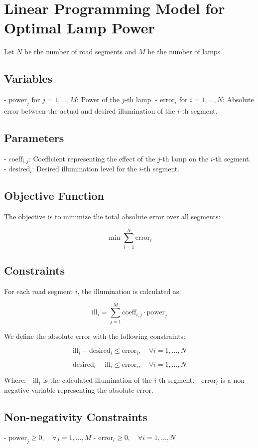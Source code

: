 \documentclass{article}
\begin{document}
\section*{Linear Programming Model for Optimal Lamp Power}

Let \( N \) be the number of road segments and \( M \) be the number of lamps.

\subsection*{Variables}
- \( \text{power}_j \) for \( j = 1, \ldots, M \): Power of the \( j \)-th lamp.
- \( \text{error}_i \) for \( i = 1, \ldots, N \): Absolute error between the actual and desired illumination of the \( i \)-th segment.

\subsection*{Parameters}
- \( \text{coeff}_{i,j} \): Coefficient representing the effect of the \( j \)-th lamp on the \( i \)-th segment.
- \( \text{desired}_i \): Desired illumination level for the \( i \)-th segment.

\subsection*{Objective Function}
The objective is to minimize the total absolute error over all segments:

\[
\min \sum_{i=1}^{N} \text{error}_i
\]

\subsection*{Constraints}
For each road segment \( i \), the illumination is calculated as:

\[
\text{ill}_i = \sum_{j=1}^{M} \text{coeff}_{i,j} \cdot \text{power}_j
\]

We define the absolute error with the following constraints:

\[
\text{ill}_i - \text{desired}_i \leq \text{error}_i, \quad \forall i = 1, \ldots, N
\]

\[
\text{desired}_i - \text{ill}_i \leq \text{error}_i, \quad \forall i = 1, \ldots, N
\]

Where:
- \( \text{ill}_i \) is the calculated illumination of the \( i \)-th segment.
- \( \text{error}_i \) is a non-negative variable representing the absolute error.

\subsection*{Non-negativity Constraints}
- \( \text{power}_j \geq 0, \quad \forall j = 1, \ldots, M \)
- \( \text{error}_i \geq 0, \quad \forall i = 1, \ldots, N \)
\end{document}
